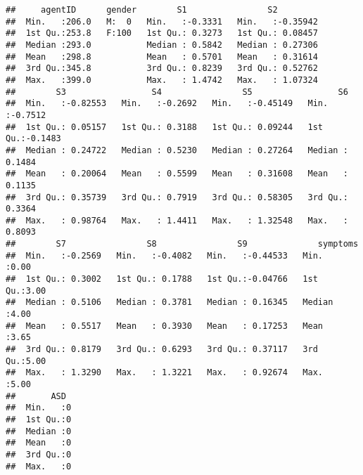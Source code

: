 \documentclass[]{article}
\begin{document}
\begin{verbatim}
##     agentID      gender        S1                S2          
##  Min.   :206.0   M:  0   Min.   :-0.3331   Min.   :-0.35942  
##  1st Qu.:253.8   F:100   1st Qu.: 0.3273   1st Qu.: 0.08457  
##  Median :293.0           Median : 0.5842   Median : 0.27306  
##  Mean   :298.8           Mean   : 0.5701   Mean   : 0.31614  
##  3rd Qu.:345.8           3rd Qu.: 0.8239   3rd Qu.: 0.52762  
##  Max.   :399.0           Max.   : 1.4742   Max.   : 1.07324  
##        S3                 S4                S5                 S6         
##  Min.   :-0.82553   Min.   :-0.2692   Min.   :-0.45149   Min.   :-0.7512  
##  1st Qu.: 0.05157   1st Qu.: 0.3188   1st Qu.: 0.09244   1st Qu.:-0.1483  
##  Median : 0.24722   Median : 0.5230   Median : 0.27264   Median : 0.1484  
##  Mean   : 0.20064   Mean   : 0.5599   Mean   : 0.31608   Mean   : 0.1135  
##  3rd Qu.: 0.35739   3rd Qu.: 0.7919   3rd Qu.: 0.58305   3rd Qu.: 0.3364  
##  Max.   : 0.98764   Max.   : 1.4411   Max.   : 1.32548   Max.   : 0.8093  
##        S7                S8                S9              symptoms   
##  Min.   :-0.2569   Min.   :-0.4082   Min.   :-0.44533   Min.   :0.00  
##  1st Qu.: 0.3002   1st Qu.: 0.1788   1st Qu.:-0.04766   1st Qu.:3.00  
##  Median : 0.5106   Median : 0.3781   Median : 0.16345   Median :4.00  
##  Mean   : 0.5517   Mean   : 0.3930   Mean   : 0.17253   Mean   :3.65  
##  3rd Qu.: 0.8179   3rd Qu.: 0.6293   3rd Qu.: 0.37117   3rd Qu.:5.00  
##  Max.   : 1.3290   Max.   : 1.3221   Max.   : 0.92674   Max.   :5.00  
##       ASD   
##  Min.   :0  
##  1st Qu.:0  
##  Median :0  
##  Mean   :0  
##  3rd Qu.:0  
##  Max.   :0
\end{verbatim}
\end{document}
